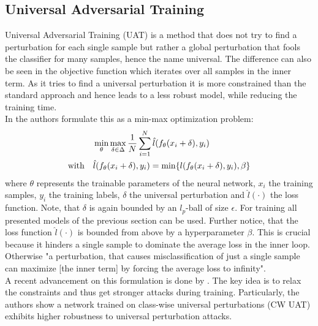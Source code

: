 \documentclass{article}
\begin{document}
\subsection{Universal Adversarial Training}
Universal Adversarial Training (UAT) is a method that does not try to find a perturbation for each single sample but rather a global perturbation that fools the classifier for many samples, hence the name universal. The difference can also be seen in the objective function which iterates over all samples in the inner term. As it tries to find a universal perturbation it is more constrained than the standard approach and hence leads to a less robust model, while reducing the training time. \\
In \cite{b4} the authors formulate this as a min-max optimization problem:
\begingroup
\setlength\abovedisplayskip{0pt}
\setlength\belowdisplayskip{6pt}
\begin{align}
  \label{eqn:universal}
  & \min_{\theta} \max_{\delta \in \Delta} \space \frac{1}{N} \sum_{i=1}^N \space \hat{l}(f_{\theta}(x_i + \delta), y_i) \\
  \text{with} \quad & \hat{l}(f_{\theta}(x_i + \delta), y_i) = \min \{l(f_{\theta}(x_i + \delta), y_i), \beta \}
\end{align}
\endgroup
where $\theta$ represents the trainable parameters of the neural network, $x_i$ the training samples, $y_i$ the training labels, $\delta$ the universal perturbation and $\hat{l}(\cdot)$ the loss function. Note, that $\delta$ is again bounded by an $l_p$-ball of size $\epsilon$. For training all presented models of the previous section can be used. Further notice, that the loss function $\hat{l}(\cdot)$ is bounded from above by a hyperparameter $\beta$. This is crucial because it hinders a single sample to dominate the average loss in the inner loop. Otherwise "a perturbation, that causes misclassification of just a single sample can maximize [the inner term] by forcing the average loss to infinity"\cite{b4}. \\
A recent advancement on this formulation is done by \cite{b11}. The key idea is to relax the constraints and thus get stronger attacks during training. Particularly, the authors show a network trained on class-wise universal perturbations (CW UAT) exhibits higher robustness to universal perturbation attacks.
  
\end{document}
